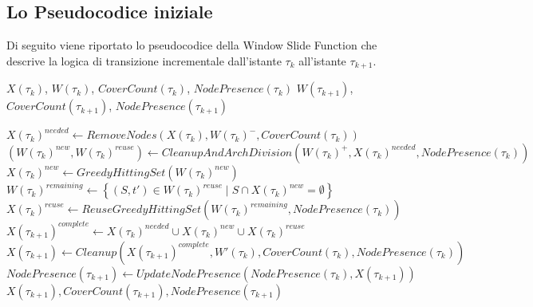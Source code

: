 \subsection{Lo Pseudocodice iniziale}

Di seguito viene riportato lo pseudocodice della Window Slide Function che descrive la logica di transizione incrementale dall'istante $\tau_k$ all'istante $\tau_{k+1}$.

\begin{algorithm}
\caption{Window Slide Function}\label{alg:window_slide_function}
\begin{algorithmic}[1]

\Require $X(\tau_k)$, $W(\tau_k)$, $CoverCount(\tau_k)$, $NodePresence(\tau_k)$
\Ensure $W(\tau_{k+1})$, $CoverCount(\tau_{k+1})$, $NodePresence(\tau_{k+1})$

\State $X(\tau_k)^{needed}\gets RemoveNodes(X(\tau_k),W(\tau_k)^-,CoverCount(\tau_k))$
\State $(W(\tau_k)^{new}, W(\tau_k)^{reuse})\gets CleanupAndArchDivision(W(\tau_k)^+,X(\tau_k)^{needed},NodePresence(\tau_k))$
\State $X(\tau_k)^{new}\gets GreedyHittingSet(W(\tau_k)^{new})$
\State $W(\tau_k)^{remaining}\gets \left\{(S,t')\in W(\tau_k)^{reuse}\mid S \cap X(\tau_k)^{new}=\emptyset\right\}$
\State $X(\tau_k)^{reuse}\gets ReuseGreedyHittingSet(W(\tau_k)^{remaining},NodePresence(\tau_k))$
\State $X(\tau_{k+1})^{complete}\gets X(\tau_k)^{needed} \cup X(\tau_k)^{new} \cup X(\tau_k)^{reuse}$
\State $X(\tau_{k+1})\gets Cleanup(X(\tau_{k+1})^{complete}, W'(\tau_k), CoverCount(\tau_k), NodePresence(\tau_k))$
\State $NodePresence(\tau_{k+1})\gets UpdateNodePresence(NodePresence(\tau_k), X(\tau_{k+1}))$
\State \Return $X(\tau_{k+1}), CoverCount(\tau_{k+1}), NodePresence(\tau_{k+1})$

\end{algorithmic}
\end{algorithm}

